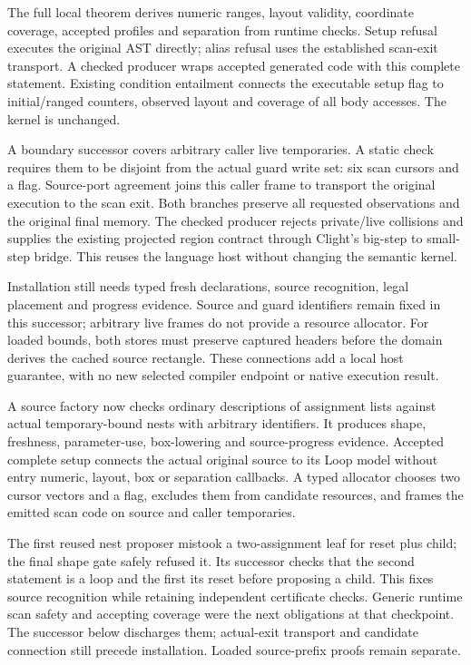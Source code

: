 The full local theorem derives numeric ranges, layout validity, coordinate
coverage, accepted profiles and separation from runtime checks. Setup refusal executes
the original AST directly; alias refusal uses the established scan-exit
transport. A checked producer wraps accepted generated code with this complete
statement. Existing condition entailment connects the executable setup flag
to initial/ranged counters, observed layout and coverage of all body accesses.
The kernel is unchanged.

A boundary successor covers arbitrary caller live temporaries. A static check
requires them to be disjoint from the actual guard write set: six scan cursors
and a flag. Source-port agreement joins this caller frame to transport the
original execution to the scan exit. Both branches preserve all requested
observations and the original final memory. The checked producer rejects
private/live collisions and supplies the existing projected region contract
through Clight's big-step to small-step bridge. This reuses the language host
without changing the semantic kernel.

Installation still needs typed fresh declarations, source recognition, legal
placement and progress evidence. Source and guard identifiers remain fixed in
this successor; arbitrary live frames do not provide a resource allocator.
For loaded bounds, both stores must preserve captured headers before the domain
derives the cached source rectangle. These connections add a local host
guarantee, with no new selected compiler endpoint or native execution result.

A source factory now checks ordinary descriptions of assignment lists against
actual temporary-bound nests with arbitrary identifiers. It produces shape,
freshness, parameter-use, box-lowering and source-progress evidence. Accepted
complete setup connects the actual original source to its Loop model without
entry numeric, layout, box or separation callbacks. A typed allocator chooses
two cursor vectors and a flag, excludes them from candidate resources, and
frames the emitted scan code on source and caller temporaries.

The first reused nest proposer mistook a two-assignment leaf for reset plus
child; the final shape gate safely refused it. Its successor checks that the
second statement is a loop and the first its reset before proposing a child.
This fixes source recognition while retaining independent certificate checks.
Generic runtime scan safety and accepting coverage were the next obligations
at that checkpoint. The successor below discharges them; actual-exit transport
and candidate connection still precede installation. Loaded source-prefix
proofs remain separate.

